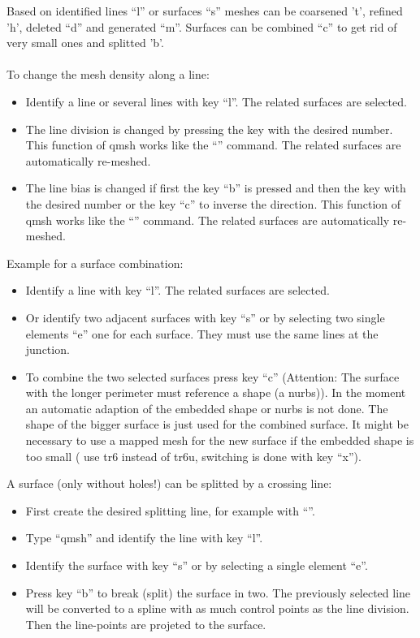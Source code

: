 \documentclass{article}
\begin{document}
Based on identified lines ``l'' or surfaces ``s'' meshes can be coarsened 't', refined 'h', deleted ``d'' and generated ``m''. Surfaces can be combined ``c'' to get rid of very small ones and splitted 'b'.\\\\
To change the mesh density along a line:
\begin{itemize}
\item Identify a line or several lines with key ``l''. The related surfaces are selected.
\item The line division is changed by pressing the key with the desired number. This function of qmsh works like the ``'' command. The related surfaces are automatically re-meshed.
\item The line bias is changed if first the key ``b'' is pressed and then the key with the desired number or the key ``c'' to inverse the direction. This function of qmsh works like the ``'' command. The related surfaces are automatically re-meshed.
\end{itemize}
Example for a surface combination:
\begin{itemize}
\item Identify a line with key ``l''. The related surfaces are selected.
\item Or identify two adjacent surfaces with key ``s'' or by selecting two single elements ``e'' one for each surface. They must use the same lines at the junction. 
\item To combine the two selected surfaces press key ``c'' (Attention: The surface with the longer perimeter must reference a shape (a nurbs)). In the moment an automatic adaption of the embedded shape or nurbs is not done. The shape of the bigger surface is just used for the combined surface. It might be necessary to use a mapped mesh for the new surface if the embedded shape is too small ( use tr6 instead of tr6u, switching is done with key ``x'').
\end{itemize}
A surface (only without holes!) can be splitted by a crossing line:
\begin{itemize}
\item First create the desired splitting line, for example with ``''.
\item Type ``qmsh'' and identify the line with key ``l''.
\item Identify the surface with key ``s'' or by selecting a single element ``e''.
\item Press key ``b'' to break (split) the surface in two. The previously selected line will be converted to a spline with as much control points as the line division. Then the line-points are projeted to the surface.
\end{itemize}
\end{document}
